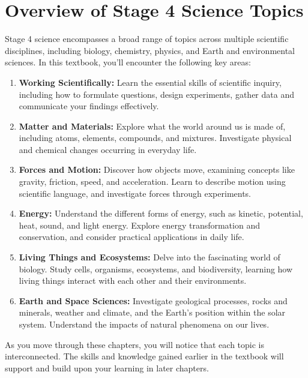 \FloatBarrier

\section{Overview of Stage 4 Science Topics}

Stage 4 science encompasses a broad range of topics across multiple scientific disciplines, including biology, chemistry, physics, and Earth and environmental sciences. In this textbook, you'll encounter the following key areas:

\begin{enumerate}
    \item \textbf{Working Scientifically:} Learn the essential skills of scientific inquiry, including how to formulate questions, design experiments, gather data and communicate your findings effectively.
    
    \item \textbf{Matter and Materials:} Explore what the world around us is made of, including atoms, elements, compounds, and mixtures. Investigate physical and chemical changes occurring in everyday life.
    
    \item \textbf{Forces and Motion:} Discover how objects move, examining concepts like gravity, friction, speed, and acceleration. Learn to describe motion using scientific language, and investigate forces through experiments.
    
    \item \textbf{Energy:} Understand the different forms of energy, such as kinetic, potential, heat, sound, and light energy. Explore energy transformation and conservation, and consider practical applications in daily life.
    
    \item \textbf{Living Things and Ecosystems:} Delve into the fascinating world of biology. Study cells, organisms, ecosystems, and biodiversity, learning how living things interact with each other and their environments.
    
    \item \textbf{Earth and Space Sciences:} Investigate geological processes, rocks and minerals, weather and climate, and the Earth's position within the solar system. Understand the impacts of natural phenomena on our lives.
\end{enumerate}

As you move through these chapters, you will notice that each topic is interconnected. The skills and knowledge gained earlier in the textbook will support and build upon your learning in later chapters.

